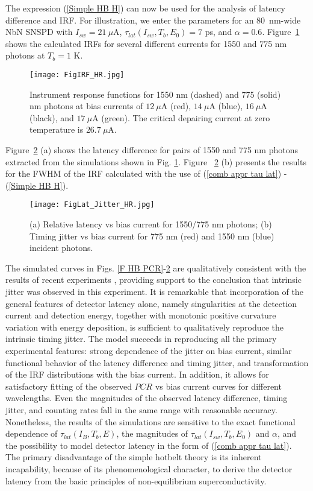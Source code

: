 \documentclass[%
reprint,
 amsmath,amssymb,
aps,
pra,
]{revtex4-1}
\begin{document}
The expression (\ref{Simple HB H}) can now be used for the analysis of latency difference and IRF. For illustration, we enter the parameters for an 80~nm-wide NbN SNSPD with \(I_{sw} = 21~\mu\)A, \(\tau_{lat}\left(I_{sw},T_b,E_0\right) = 7\) ps, and \(\alpha = 0.6 \).  Figure~\ref{F Histograms} shows the calculated IRFs for several different currents for 1550 and 775 nm photons at \(T_b = 1 \text{ K}\).
\begin{figure}
\texttt{[image: FigIRF\_HR.jpg]}
\caption{Instrument response functions for 1550 nm (dashed) and 775 (solid) nm photons at bias currents of \(12\: \mu\)A (red), \(14\: \mu\)A (blue), \(16\: \mu\)A (black), and \(17\: \mu\)A (green). The critical depairing current at zero temperature is \(26.7\: \mu\)A.}
\label{F Histograms}
\end{figure}
Figure~\ref{F HB Latency} (a) shows the latency difference for pairs of 1550 and 775 nm photons extracted from the simulations shown in Fig. \ref{F Histograms}. Figure~ \ref{F HB Latency} (b) presents the results for the FWHM of the IRF calculated with the use of (\ref{comb appr tau lat}) - (\ref{Simple HB H}).
\begin{figure}
\texttt{[image: FigLat\_Jitter\_HR.jpg]}
\caption{(a) Relative latency vs bias current for 1550/775 nm photons; (b) Timing jitter vs bias current for 775 nm (red) and 1550 nm (blue) incident photons.}
\label{F HB Latency}
\end{figure}

\quad The simulated curves in Figs. \ref{F HB PCR}-\ref{F HB Latency} are qualitatively consistent with the results of recent experiments \cite{korzh_demonstrating_2018}, providing support to the conclusion that intrinsic jitter was observed in this experiment. It is remarkable that incorporation of the general features of detector latency alone, namely singularities at the detection current and detection energy, together with monotonic positive curvature variation with energy deposition, is sufficient to qualitatively reproduce the intrinsic timing jitter. The model succeeds in reproducing all the primary experimental features: strong dependence of the jitter on bias current, similar functional behavior of the latency difference and timing jitter, and transformation of the IRF distributions with the bias current.  In addition, it allows for satisfactory fitting of the observed $PCR$ vs bias current curves for different wavelengths. Even the magnitudes of the observed latency difference, timing jitter, and counting rates fall in the same range with reasonable accuracy.  Nonetheless, the results of the simulations are sensitive to the exact functional dependence of \(\tau_{lat}\left(I_{B},T_b,E\right)\), the magnitudes of \(\tau_{lat}\left(I_{sw},T_b,E_0\right)\) and  \(\alpha\), and the possibility to model detector latency in the form of (\ref{comb appr tau lat}). The primary disadvantage of the simple hotbelt theory is its inherent incapability, because of its phenomenological character, to derive the detector latency from the basic principles of non-equilibrium superconductivity. 
\end{document}
